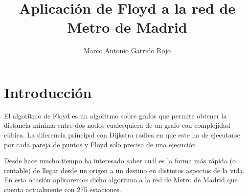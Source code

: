 \documentclass[spanish, a4paper, 12pt] {article}
\begin{document}
\title{Aplicación de Floyd a la red de Metro de Madrid}
\author{Marco Antonio Garrido Rojo}
\date{}
\maketitle
\section{Introducción}
El algoritmo de Floyd es un algoritmo sobre grafos que permite obtener la distancia mínima entre dos nodos cualesquiera de un grafo con complejidad cúbica. La diferencia principal con Dijkstra radica en que este ha de ejecutarse por cada pareja de puntos y Floyd solo precisa de una ejecución.\\ \par
Desde hace mucho tiempo ha interesado saber cuál es la forma más rápida (o rentable) de llegar desde un origen a un destino en distintos aspectos de la vida. En esta ocasión aplicaremos dicho algoritmo a la red de Metro de Madrid que cuenta actualmente con 275 estaciones.
\end{document}
